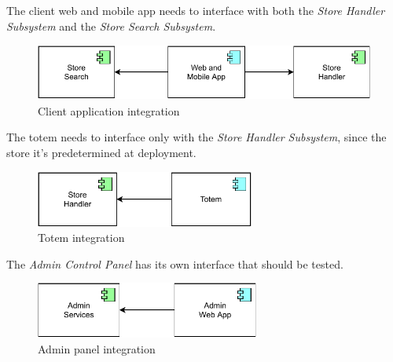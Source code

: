 The client web and mobile app needs to interface with both the \emph{Store Handler Subsystem} and the \emph{Store Search Subsystem}.

\begin{figure}[H]
    \centering
    \includegraphics[height=5em]{images/draw.io/web_mobile_app_integration.pdf}
    \caption{Client application integration}
    \label{fig:client_application_integration}
\end{figure}

The totem needs to interface only with the \emph{Store Handler Subsystem}, since the store it's predetermined at deployment.

\begin{figure}[H]
    \centering
    \includegraphics[height=5em]{images/draw.io/totem_integration.pdf}
    \caption{Totem integration}
    \label{fig:totem_integration}
\end{figure}

The \emph{Admin Control Panel} has its own interface that should be tested.

\begin{figure}[H]
    \centering
    \includegraphics[height=5em]{images/draw.io/admin_panel_integration.pdf}
    \caption{Admin panel integration}
    \label{fig:admin_panel_integration}
\end{figure}

